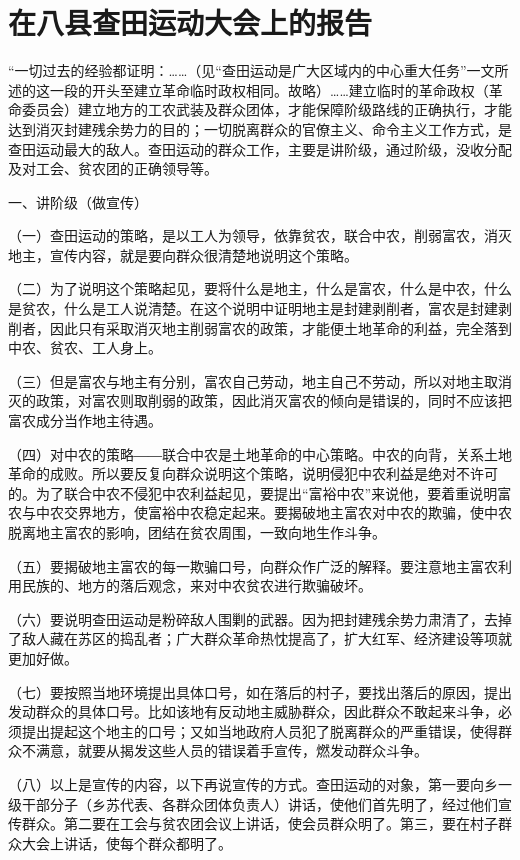 \section[在八县查田运动大会上的报告（一九三三年六月十四日）]{在八县查田运动大会上的报告}


“一切过去的经验都证明：……（见“查田运动是广大区域内的中心重大任务”一文所述的这一段的开头至建立革命临时政权相同。故略）……建立临时的革命政权（革命委员会）建立地方的工农武装及群众团体，才能保障阶级路线的正确执行，才能达到消灭封建残余势力的目的；一切脱离群众的官僚主义、命令主义工作方式，是查田运动最大的敌人。查田运动的群众工作，主要是讲阶级，通过阶级，没收分配及对工会、贫农团的正确领导等。

一、讲阶级（做宣传）

（一）查田运动的策略，是以工人为领导，依靠贫农，联合中农，削弱富农，消灭地主，宣传内容，就是要向群众很清楚地说明这个策略。

（二）为了说明这个策略起见，要将什么是地主，什么是富农，什么是中农，什么是贫农，什么是工人说清楚。在这个说明中证明地主是封建剥削者，富农是封建剥削者，因此只有采取消灭地主削弱富农的政策，才能便土地革命的利益，完全落到中农、贫农、工人身上。

（三）但是富农与地主有分别，富农自己劳动，地主自己不劳动，所以对地主取消灭的政策，对富农则取削弱的政策，因此消灭富农的倾向是错误的，同时不应该把富农成分当作地主待遇。

（四）对中农的策略――联合中农是土地革命的中心策略。中农的向背，关系土地革命的成败。所以要反复向群众说明这个策略，说明侵犯中农利益是绝对不许可的。为了联合中农不侵犯中农利益起见，要提出“富裕中农”来说他，要着重说明富农与中农交界地方，使富裕中农稳定起来。要揭破地主富农对中农的欺骗，使中农脱离地主富农的影响，团结在贫农周围，一致向地生作斗争。

（五）要揭破地主富农的每一欺骗口号，向群众作广泛的解释。要注意地主富农利用民族的、地方的落后观念，来对中农贫农进行欺骗破坏。

（六）要说明查田运动是粉碎敌人围剿的武器。因为把封建残余势力肃清了，去掉了敌人藏在苏区的捣乱者；广大群众革命热忱提高了，扩大红军、经济建设等项就更加好做。

（七）要按照当地环境提出具体口号，如在落后的村子，要找出落后的原因，提出发动群众的具体口号。比如该地有反动地主威胁群众，因此群众不敢起来斗争，必须提出提起这个地主的口号；又如当地政府人员犯了脱离群众的严重错误，使得群众不满意，就要从揭发这些人员的错误着手宣传，燃发动群众斗争。

（八）以上是宣传的内容，以下再说宣传的方式。查田运动的对象，第一要向乡一级干部分子（乡苏代表、各群众团体负责人）讲话，使他们首先明了，经过他们宣传群众。第二要在工会与贫农团会议上讲话，使会员群众明了。第三，要在村子群众大会上讲话，使每个群众都明了。

